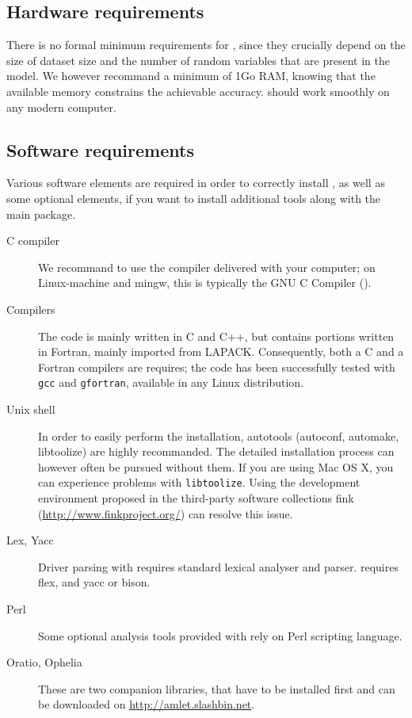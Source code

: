 \subsection{Hardware requirements}

There is no formal minimum requirements for \amlet{}, since they
crucially depend on the size of dataset size and the number of random
variables that are present in the model.
We however recommand a minimum of 1Go RAM, knowing that the available memory constrains the achievable accuracy.
\amlet{} should work smoothly on any modern computer.

\subsection{Software requirements}

Various software elements are required in order to correctly install
\amlet{}, as well as some optional elements, if you want to
install additional tools along with the main package.

\begin{description}
\item[C compiler]
We recommand to use the compiler delivered with your
computer; on Linux-machine and mingw, this is typically the GNU C
Compiler (\gcc).
\item[Compilers]
The code is mainly written in C and C++, but contains portions written in Fortran, mainly imported from LAPACK.
Consequently, both a C and a Fortran compilers are requires; the code has been successfully tested with \verb|gcc| and \verb|gfortran|, available in any Linux distribution.
\item[Unix shell]
In order to easily perform the installation, autotools
(\textsf{autoconf}, \textsf{automake}, \textsf{libtoolize}) are highly
recommanded.
The detailed installation process can however often be pursued
without them.
If you are using Mac OS X, you can experience problems with
\verb|libtoolize|. Using the development environment proposed in the
third-party software collections fink
(\url{http://www.finkproject.org/}) can resolve this issue.
\item[Lex, Yacc]
Driver parsing with \amlet{} requires standard lexical analyser and parser.
\amlet{} requires \textsf{flex}, and \textsf{yacc} or \textsf{bison}.
\item[Perl]
Some optional analysis tools provided with \amlet{} rely on Perl scripting
language.
\item[Oratio, Ophelia]
These are two companion libraries, that have to be installed first and can be downloaded on \url{http://amlet.slashbin.net}.
\end{description}

